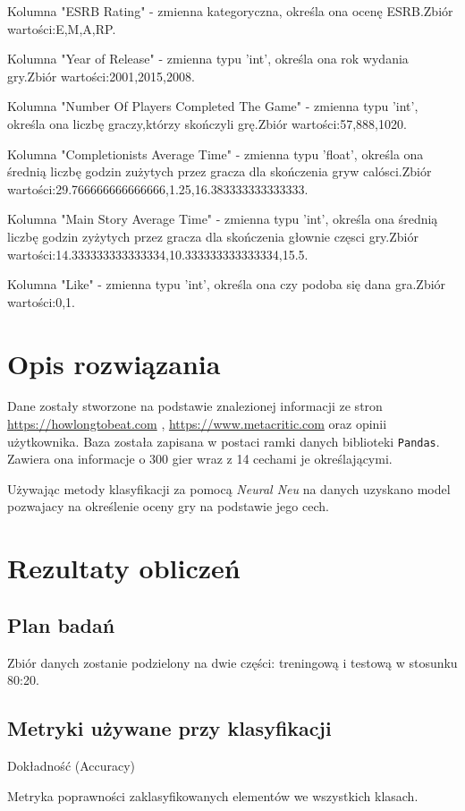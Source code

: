 \documentclass{article}
\begin{document}
Kolumna "ESRB Rating" - zmienna kategoryczna, określa ona ocenę ESRB.Zbiór wartości:E,M,A,RP.

Kolumna "Year of Release" - zmienna typu 'int', określa ona rok wydania gry.Zbiór wartości:2001,2015,2008.

Kolumna "Number Of Players Completed The Game" - zmienna typu 'int', określa ona  liczbę graczy,którzy skończyli grę.Zbiór wartości:57,888,1020.

Kolumna "Completionists Average Time" - zmienna typu 'float', określa ona średnią liczbę godzin zużytych przez gracza dla skończenia gryw calósci.Zbiór wartości:29.766666666666666,1.25,16.383333333333333.

Kolumna "Main Story Average Time" - zmienna typu 'int', określa ona średnią liczbę godzin zyżytych przez gracza dla skończenia głownie częsci gry.Zbiór wartości:14.333333333333334,10.333333333333334,15.5.

Kolumna "Like" - zmienna typu 'int', określa ona czy podoba się dana gra.Zbiór wartości:0,1.

\section{Opis rozwiązania}
Dane zostały stworzone na podstawie znalezionej informacji ze stron \url{https://howlongtobeat.com} , \url{https://www.metacritic.com} oraz opinii użytkownika.
 Baza została zapisana w postaci ramki danych biblioteki \texttt{Pandas}. Zawiera ona informacje o 300 gier wraz z 14 cechami je określającymi.

Używając metody klasyfikacji za pomocą \textit{Neural Neu} na danych uzyskano model pozwajacy na określenie oceny gry na podstawie jego cech.

\section{Rezultaty obliczeń}

\subsection{Plan badań}
Zbiór danych zostanie podzielony na dwie części: treningową i testową w stosunku 80:20. 
\subsection{Metryki używane przy klasyfikacji}
Dokładność (Accuracy)

Metryka poprawności zaklasyfikowanych elementów we wszystkich klasach.
\end{document}
